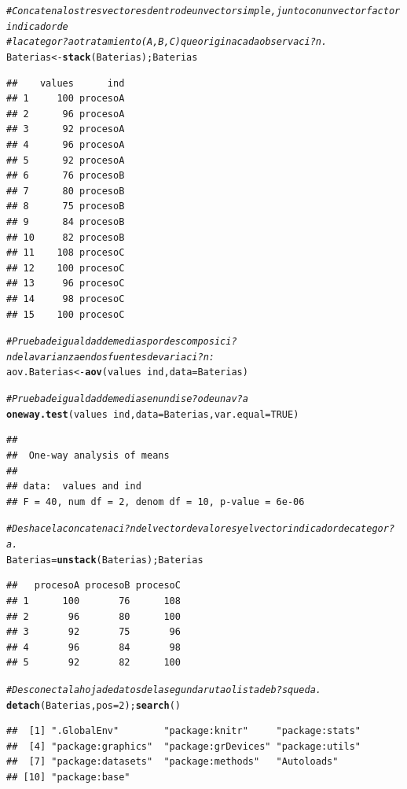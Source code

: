 \documentclass[10pt,a4paper]{article}\usepackage[]{graphicx}\usepackage[]{color}
\makeatletter
\newcommand{\hlnum}[1]{\textcolor[rgb]{0.686,0.059,0.569}{#1}}%
\newcommand{\hlcom}[1]{\textcolor[rgb]{0.678,0.584,0.686}{\textit{#1}}}%
\newcommand{\hlopt}[1]{\textcolor[rgb]{0,0,0}{#1}}%
\newcommand{\hlstd}[1]{\textcolor[rgb]{0.345,0.345,0.345}{#1}}%
\newcommand{\hlkwb}[1]{\textcolor[rgb]{0.69,0.353,0.396}{#1}}%
\newcommand{\hlkwc}[1]{\textcolor[rgb]{0.333,0.667,0.333}{#1}}%
\newcommand{\hlkwd}[1]{\textcolor[rgb]{0.737,0.353,0.396}{\textbf{#1}}}%
\newenvironment{kframe}{%
 \def\at@end@of@kframe{}%
 \ifinner\ifhmode%
  \def\at@end@of@kframe{\end{minipage}}%
  \begin{minipage}{\columnwidth}%
 \fi\fi%
 \def\FrameCommand##1{\hskip\@totalleftmargin \hskip-\fboxsep
 \colorbox{shadecolor}{##1}\hskip-\fboxsep
     \hskip-\linewidth \hskip-\@totalleftmargin \hskip\columnwidth}%
 \MakeFramed {\advance\hsize-\width
   \@totalleftmargin\z@ \linewidth\hsize
   \@setminipage}}%
 {\par\unskip\endMakeFramed%
 \at@end@of@kframe}
\newenvironment{knitrout}{}{} %
\makeatother
\begin{document}
\begin{knitrout}
\begin{kframe}
\begin{alltt}
\hlcom{# Concatena los tres vectores dentro de un vector simple, junto con un vector factor indicador de }
\hlcom{#la categor?a o tratamiento (A, B, C) que origina cada observaci?n.}
\hlstd{Baterias} \hlkwb{<-} \hlkwd{stack}\hlstd{(Baterias); Baterias}
\end{alltt}
\begin{verbatim}
##    values      ind
## 1     100 procesoA
## 2      96 procesoA
## 3      92 procesoA
## 4      96 procesoA
## 5      92 procesoA
## 6      76 procesoB
## 7      80 procesoB
## 8      75 procesoB
## 9      84 procesoB
## 10     82 procesoB
## 11    108 procesoC
## 12    100 procesoC
## 13     96 procesoC
## 14     98 procesoC
## 15    100 procesoC
\end{verbatim}
\end{kframe}
\end{knitrout}

\begin{knitrout}
\color{fgcolor}\begin{kframe}
\begin{alltt}
\hlcom{# Prueba de igualdad de medias por descomposici?n de la varianza en dos fuentes de variaci?n:}
\hlstd{aov.Baterias} \hlkwb{<-} \hlkwd{aov}\hlstd{(values}\hlopt{~}\hlstd{ind,} \hlkwc{data}\hlstd{=Baterias)}

\hlcom{# Prueba de igualdad de medias en un dise?o de una v?a}
\hlkwd{oneway.test}\hlstd{(values}\hlopt{~}\hlstd{ind,} \hlkwc{data}\hlstd{=Baterias,} \hlkwc{var.equal} \hlstd{=} \hlnum{TRUE}\hlstd{)}
\end{alltt}
\begin{verbatim}
## 
## 	One-way analysis of means
## 
## data:  values and ind
## F = 40, num df = 2, denom df = 10, p-value = 6e-06
\end{verbatim}
\begin{alltt}
\hlcom{#Deshace la concatenaci?n del vector de valores y el vector indicador de categor?a. }
\hlstd{Baterias} \hlkwb{=} \hlkwd{unstack}\hlstd{(Baterias);Baterias}
\end{alltt}
\begin{verbatim}
##   procesoA procesoB procesoC
## 1      100       76      108
## 2       96       80      100
## 3       92       75       96
## 4       96       84       98
## 5       92       82      100
\end{verbatim}
\begin{alltt}
\hlcom{#Desconecta la hoja de datos de la segunda ruta o lista de b?squeda. }
\hlkwd{detach}\hlstd{(Baterias,} \hlkwc{pos}\hlstd{=}\hlnum{2}\hlstd{);} \hlkwd{search}\hlstd{()}
\end{alltt}
\begin{verbatim}
##  [1] ".GlobalEnv"        "package:knitr"     "package:stats"    
##  [4] "package:graphics"  "package:grDevices" "package:utils"    
##  [7] "package:datasets"  "package:methods"   "Autoloads"        
## [10] "package:base"
\end{verbatim}
\end{kframe}
\end{knitrout}
\end{document}
